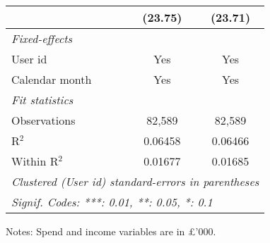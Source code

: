 \begin{table}[htbp]
\begin{threeparttable}[b]
\begin{tabular}{lcc}
                             & (23.75)        & (23.71)\\   
         \midrule
         \emph{Fixed-effects}\\
         User id             & Yes            & Yes\\  
         Calendar month      & Yes            & Yes\\  
         \midrule
         \emph{Fit statistics}\\
         Observations        & 82,589         & 82,589\\  
         R$^2$               & 0.06458        & 0.06466\\  
         Within R$^2$        & 0.01677        & 0.01685\\  
         \midrule \midrule
         \multicolumn{3}{l}{\emph{Clustered (User id) standard-errors in parentheses}}\\
         \multicolumn{3}{l}{\emph{Signif. Codes: ***: 0.01, **: 0.05, *: 0.1}}\\
      \end{tabular}
      
      \begin{tablenotes}\footnotesize
         \item Notes: Spend and income variables are in \pounds'000.
      \end{tablenotes}
   \end{threeparttable}
\end{table}


